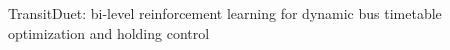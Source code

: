 \documentclass[10pt]{article}
\begin{document}
\vspace*{0.35\textheight}
\begin{center}
{\LARGE TransitDuet: bi-level reinforcement learning for dynamic bus timetable optimization and holding control}
\end{center}
\end{document}
